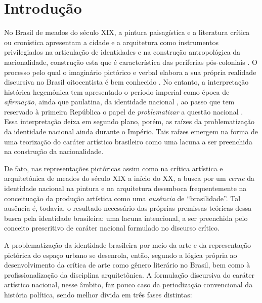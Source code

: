 \hypertarget{introduuxe7uxe3o}{%
\section{Introdução}\label{introduuxe7uxe3o}}

No Brasil de meados do século XIX, a pintura paisagística e a literatura
crítica ou cronística apresentam a cidade e a arquitetura como
instrumentos privilegiados na articulação de identidades e na construção
antropológica da nacionalidade, construção esta que é característica das
periferias pós-coloniais \autocite[173]{stocking:1982afterword47}. O
processo pelo qual o imaginário pictórico e verbal elabora a sua própria
realidade discursiva no Brasil oitocentista é bem conhecido
\autocite[8]{pesavento:2002imaginario}. No entanto, a interpretação
histórica hegemônica tem apresentado o período imperial como época de
\emph{afirmação}, ainda que paulatina, da identidade nacional
\autocite{wehling:1983origens338,moreira:2003historia43}, ao passo que
tem reservado à primeira República o papel de \emph{problematizar} a
questão nacional \autocite{oliveira:1990questao,bernd:1992literatura}.
Essa interpretação deixa em segundo plano, porém, as raízes da
problematização da identidade nacional ainda durante o Império. Tais
raízes emergem na forma de uma teorização do caráter artístico
brasileiro como uma lacuna a ser preenchida na construção da
nacionalidade.

De fato, nas representações pictóricas assim como na crítica artística e
arquitetônica de meados do século XIX a início do XX, a busca por um
\emph{cerne} da identidade nacional na pintura e na arquitetura
desemboca frequentemente na conceituação da produção artística como uma
\emph{ausência} de ``brasilidade''. Tal ausência é, todavia, o resultado
necessário das próprias premissas teóricas dessa busca pela identidade
brasileira: uma lacuna intencional, a ser preenchida pelo conceito
prescritivo de caráter nacional formulado no discurso crítico.

A problematização da identidade brasileira por meio da arte e da
representação pictórica do espaço urbano se desenrola, então, segundo a
lógica própria ao desenvolvimento da crítica de arte como gênero
literário no Brasil, bem como à profissionalização da disciplina
arquitetônica. A formulação discursiva do caráter artístico nacional,
nesse âmbito, faz pouco caso da periodização convencional da história
política, sendo melhor divida em três fases distintas:

